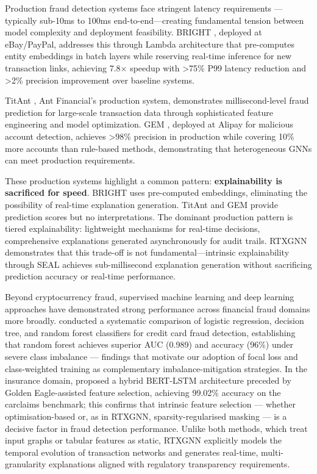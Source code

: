 Production fraud detection systems face stringent latency requirements — typically sub-10ms to 100ms end-to-end—creating fundamental tension between model complexity and deployment feasibility. BRIGHT \citep{lu2022bright}, deployed at eBay/PayPal, addresses this through Lambda architecture that pre-computes entity embeddings in batch layers while reserving real-time inference for new transaction links, achieving 7.8× speedup with >75\% P99 latency reduction and >2\% precision improvement over baseline systems.

TitAnt \citep{cao2019titant,dong2025enhancing}, Ant Financial's production system, demonstrates millisecond-level fraud prediction for large-scale transaction data through sophisticated feature engineering and model optimization. GEM \citep{liu2018gem, rao2025fraud}, deployed at Alipay for malicious account detection, achieves >98\% precision in production while covering 10\% more accounts than rule-based methods, demonstrating that heterogeneous GNNs can meet production requirements.

These production systems highlight a common pattern: \textbf{explainability is sacrificed for speed}. BRIGHT uses pre-computed embeddings, eliminating the possibility of real-time explanation generation. TitAnt and GEM provide prediction scores but no interpretations. The dominant production pattern is tiered explainability: lightweight mechanisms for real-time decisions, comprehensive explanations generated asynchronously for audit trails. RTXGNN demonstrates that this trade-off is not fundamental—intrinsic explainability through SEAL achieves sub-millisecond explanation generation without sacrificing prediction accuracy or real-time performance.

Beyond cryptocurrency fraud, supervised machine learning and deep learning 
approaches have demonstrated strong performance across financial fraud 
domains more broadly. \cite{afriyie2023supervised} conducted a systematic 
comparison of logistic regression, decision tree, and random forest 
classifiers for credit card fraud detection, establishing that random forest 
achieves superior AUC (0.989) and accuracy (96\%) under severe class 
imbalance --- findings that motivate our adoption of focal loss and 
class-weighted training as complementary imbalance-mitigation strategies. 
In the insurance domain, \cite{jacob2025golden} proposed a hybrid 
BERT-LSTM architecture preceded by Golden Eagle-assisted feature selection, 
achieving 99.02\% accuracy on the carclaims benchmark; this confirms 
that intrinsic feature selection --- whether optimisation-based or, 
as in RTXGNN, sparsity-regularised masking --- is a decisive factor in 
fraud detection performance. Unlike both methods, which treat input 
graphs or tabular features as static, RTXGNN explicitly models the 
temporal evolution of transaction networks and generates real-time, 
multi-granularity explanations aligned with regulatory transparency 
requirements.

